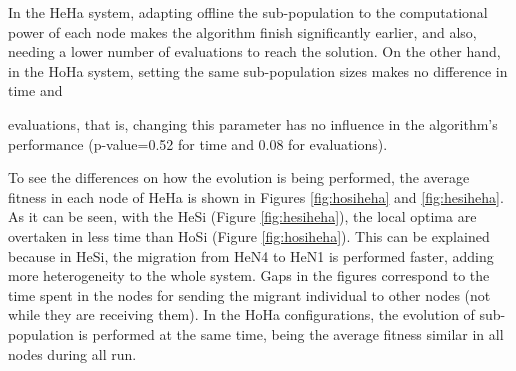\documentclass[final,1p,times]{elsarticle}
\begin{document}
 In the HeHa system, adapting offline the sub-population to the computational
 power of each node makes the algorithm finish significantly earlier,
 and also, needing a lower number of evaluations to reach the solution. On the other hand, in the HoHa system,
 setting the same sub-population sizes makes no difference in time and

 evaluations, that is, changing this parameter has no influence in the
 algorithm's performance (p-value=0.52 for time and 0.08 for evaluations).


\begin{table}
\centering
\caption{Results for the MMDP problem.}
\label{tab:resultsMMDP}
\end{table}








To see the differences on how the evolution is being performed, the average fitness in each node of HeHa is shown in Figures \ref{fig:hosiheha} and \ref{fig:hesiheha}. As it can be seen, with the HeSi (Figure \ref{fig:hesiheha}), the local optima are overtaken in less time than HoSi (Figure \ref{fig:hosiheha}).  This can be explained because in HeSi, the migration from HeN4 to HeN1 is performed faster, adding more heterogeneity to the whole system. Gaps in the figures correspond to the time spent in the nodes for sending the migrant individual to other nodes (not while they are receiving them). In the HoHa configurations, the evolution of sub-population is performed at the same time, being the average fitness similar in all nodes during all run. %
\end{document}
